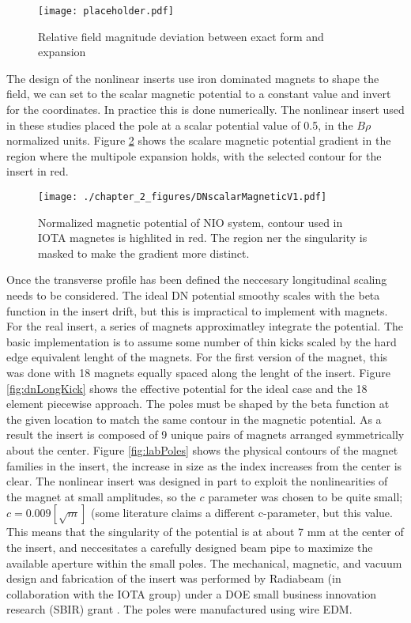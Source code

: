 \begin{figure}
	\centering
	\texttt{[image: placeholder.pdf]}
	\caption{Relative field magnitude deviation between exact form and expansion}
	\label{fig:dnMultRatio}
\end{figure}

The design of the nonlinear inserts use iron dominated magnets to shape the field, we can set to the scalar magnetic potential to a constant value and invert for the coordinates. In practice this is done numerically. The nonlinear insert used in these studies placed the pole at a scalar potential value of 0.5, in the $B\rho$ normalized units. Figure \ref{fig:dnMagPtCurve} shows the scalare magnetic potential gradient in the region where the multipole expansion holds, with the selected contour for the insert in red.

\begin{figure}
	\centering
	\texttt{[image: ./chapter\_2\_figures/DNscalarMagneticV1.pdf]}
	\caption{Normalized magnetic potential of NIO system, contour used in IOTA magnetes is highlited in red. The region ner the singularity is masked to make the gradient more distinct.}
	\label{fig:dnMagPtCurve}
\end{figure}

Once the transverse profile has been defined the neccesary longitudinal scaling needs to be considered. The ideal DN potential smoothy scales with the beta function in the insert drift, but this is impractical to implement with magnets. For the real insert, a series of magnets approximatley integrate the potential. The basic implementation is to assume some number of thin kicks scaled by the hard edge equivalent lenght of the magnets. For the first version of the magnet, this was done with 18 magnets equally spaced along the lenght of the insert. Figure \ref{fig:dnLongKick} shows the effective potential for the ideal case and the 18 element piecewise approach. The poles must be shaped by the beta function at the given location to match the same contour in the magnetic potential. As a result the insert is composed of 9 unique pairs of magnets arranged symmetrically about the center. Figure \ref{fig:labPoles} shows the physical contours of the magnet families in the insert, the increase in size as the index increases from the center is clear. The nonlinear insert was designed in part to exploit the nonlinearities of the magnet at small amplitudes, so the $c$ parameter was chosen to be quite small; $c=0.009 [\sqrt{m}]$ (some literature claims a different c-parameter, but this value. This means that the singularity of the potential is at about 7 mm at the center of the insert, and neccesitates a carefully designed beam pipe to maximize the available aperture within the small poles. The mechanical, magnetic, and vacuum design and fabrication of the insert was performed by Radiabeam (in collaboration with the IOTA group) under a DOE small business innovation research (SBIR) grant \cite{radiabeamInsertReports}. The poles were manufactured using wire EDM.  


